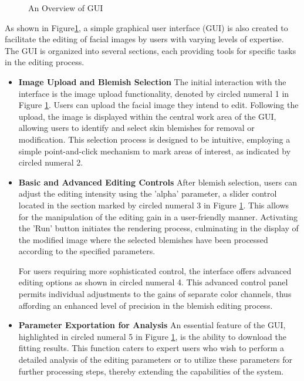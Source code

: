 \begin{spacing}{1.5}
\begin{figure}[t!]
    \caption{An Overview of GUI}
    \label{fig:gui}
\end{figure}
As shown in Figure\ref{fig:gui}, a simple graphical user interface (GUI) is also created to facilitate the editing of facial images by users with varying levels of expertise. The GUI is organized into several sections, each providing tools for specific tasks in the editing process.
\begin{itemize}
    \item \textbf{Image Upload and Blemish Selection} The initial interaction with the interface is the image upload functionality, denoted by circled numeral 1 in Figure \ref{fig:gui}. Users can upload the facial image they intend to edit. Following the upload, the image is displayed within the central work area of the GUI, allowing users to identify and select skin blemishes for removal or modification. This selection process is designed to be intuitive, employing a simple point-and-click mechanism to mark areas of interest, as indicated by circled numeral 2.
    \item \textbf{Basic and Advanced Editing Controls} After blemish selection, users can adjust the editing intensity using the 'alpha' parameter, a slider control located in the section marked by circled numeral 3 in Figure \ref{fig:gui}. This allows for the manipulation of the editing gain in a user-friendly manner. Activating the 'Run' button initiates the rendering process, culminating in the display of the modified image where the selected blemishes have been processed according to the specified parameters.

    For users requiring more sophisticated control, the interface offers advanced editing options as shown in circled numeral 4. This advanced control panel permits individual adjustments to the gains of separate color channels, thus affording an enhanced level of precision in the blemish editing process.
    \item \textbf{Parameter Exportation for Analysis} An essential feature of the GUI, highlighted in circled numeral 5 in Figure \ref{fig:gui}, is the ability to download the fitting results. This function caters to expert users who wish to perform a detailed analysis of the editing parameters or to utilize these parameters for further processing steps, thereby extending the capabilities of the system.
\end{itemize}
\end{spacing}
\newpage
